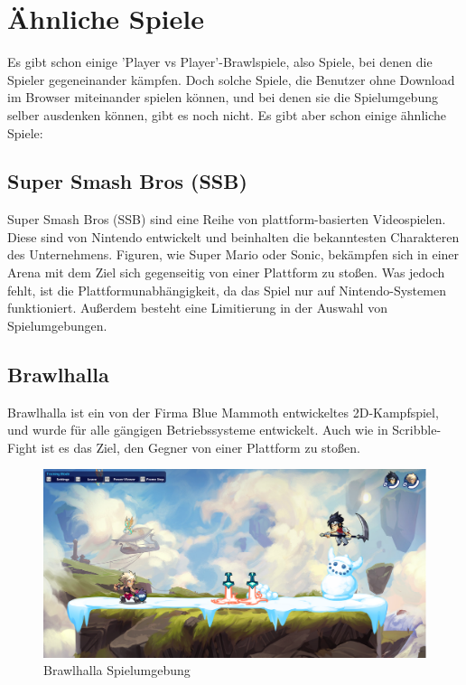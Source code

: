 \section{Ähnliche Spiele}
Es gibt schon einige 'Player vs Player'-Brawlspiele, also Spiele, bei denen die Spieler gegeneinander kämpfen. Doch solche Spiele, die Benutzer ohne Download im Browser
miteinander spielen können, und bei denen sie die Spielumgebung selber ausdenken können, gibt es noch nicht. Es gibt aber schon einige ähnliche Spiele:

\subsection{Super Smash Bros (SSB)}
Super Smash Bros (SSB) sind eine Reihe von plattform-basierten Videospielen.
Diese sind von Nintendo entwickelt und beinhalten die bekanntesten Charakteren des Unternehmens.
Figuren, wie Super Mario oder Sonic, bekämpfen sich in einer Arena mit dem Ziel sich gegenseitig
von einer Plattform zu stoßen.
Was jedoch fehlt, ist die Plattformunabhängigkeit, da das Spiel nur auf Nintendo-Systemen funktioniert.
Außerdem besteht eine Limitierung in der Auswahl von Spielumgebungen.

\subsection{Brawlhalla}
Brawlhalla ist ein von der Firma Blue Mammoth entwickeltes 2D-Kampfspiel, und wurde für alle gängigen Betriebssysteme entwickelt.
Auch wie in Scribble-Fight ist es das Ziel, den Gegner von einer Plattform zu stoßen.

\begin{figure}[H]
    \centering
    \includegraphics[scale=0.3]{pics/brawlhalla.PNG}
    \caption{Brawlhalla Spielumgebung}
    \label{fig:impl:knuth}
\end{figure}


